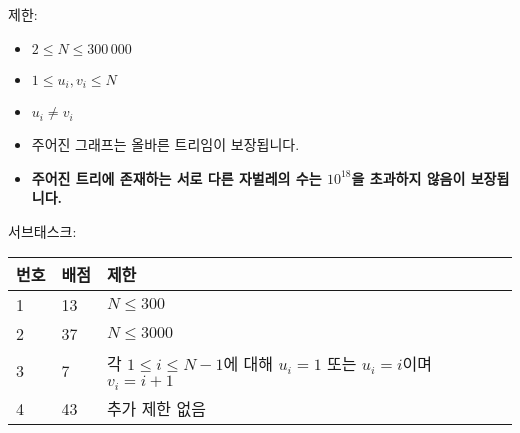 제한:

\begin{itemize}
\item $2 \le N \le 300\,000$
\item $1 \le u_i,v_i \le N$
\item $u_i \neq v_i$
\item 주어진 그래프는 올바른 트리임이 보장됩니다.
\item \textbf{주어진 트리에 존재하는 서로 다른 자벌레의 수는 $10^{18}$을 초과하지 않음이 보장됩니다.}
\end{itemize}

서브태스크:

\begin{tabular}{|l|l|l|} \hline
  \textbf{번호} & \textbf{배점} & \textbf{제한} \\ \hline
  1 & 13 & $N \le 300$ \\ \hline
  2 & 37 & $N \le 3000$ \\ \hline
  3 & 7 & 각 $1 \le i \le N-1$에 대해 $u_i=1$ 또는 $u_i=i$이며 $v_i=i+1$ \\ \hline
  4 & 43 & 추가 제한 없음 \\ \hline
\end{tabular}